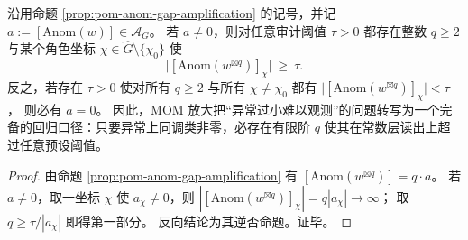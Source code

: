 \begin{corollary}\label{cor:pom-anom-gap-amplification-completeness}
沿用命题 \ref{prop:pom-anom-gap-amplification} 的记号，并记
\(
a:=[\mathrm{Anom}(w)]\in\mathcal{A}_G
\)。
若 \(a\neq 0\)，则对任意审计阈值 \(\tau>0\) 都存在整数 \(q\ge 2\) 与某个角色坐标 \(\chi\in\widehat G\setminus\{\chi_0\}\) 使
\[
\bigl|[\mathrm{Anom}(w^{\boxtimes q})]_{\chi}\bigr|\ \ge\ \tau.
\]
反之，若存在 \(\tau>0\) 使对所有 \(q\ge 2\) 与所有 \(\chi\neq\chi_0\) 都有
\(
\bigl|[\mathrm{Anom}(w^{\boxtimes q})]_{\chi}\bigr|<\tau
\)，
则必有 \(a=0\)。
因此，MOM 放大把“异常过小难以观测”的问题转写为一个完备的回归口径：只要异常上同调类非零，必存在有限阶 \(q\) 使其在常数层读出上超过任意预设阈值。
\end{corollary}
\begin{proof}
由命题 \ref{prop:pom-anom-gap-amplification} 有
\(
[\mathrm{Anom}(w^{\boxtimes q})]=q\cdot a
\)。
若 \(a\neq 0\)，取一坐标 \(\chi\) 使 \(a_\chi\neq 0\)，则
\(
|[\mathrm{Anom}(w^{\boxtimes q})]_\chi|
=q|a_\chi|
\to\infty
\)；
取 \(q\ge \tau/|a_\chi|\) 即得第一部分。
反向结论为其逆否命题。证毕。
\end{proof}


